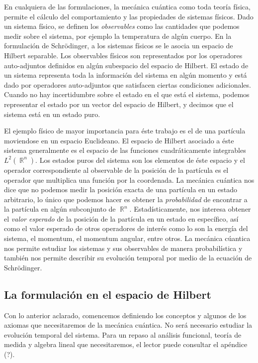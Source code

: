 \documentclass[a4paper]{report}
\DeclareMathOperator{\R}{\mathbb{R}}
\begin{document}
  En cualquiera de las formulaciones, la mecánica cuántica
  como toda teoría física, permite el cálculo del
  comportamiento y las propiedades de sistemas físicos. Dado
  un sistema físico, se definen los \textit{observables}
  como las cantidades que podemos medir sobre el sistema,
  por ejemplo la temperatura de algún cuerpo. En la
  formulación de Schrödinger, a los sistemas físicos se le
  asocia un espacio de Hilbert separable. Los observables
  físicos son representados por los operadores auto-adjuntos
  definidos en algún subespacio del espacio de Hilbert. El
  estado de un sistema representa toda la información del
  sistema en algún momento y está dado por operadores
  auto-adjuntos que satisfacen ciertas condiciones
  adicionales. Cuando no hay incertidumbre sobre el estado
  en el que está el sistema, podemos representar el estado
  por un vector del espacio de Hilbert, y decimos que el
  sistema está en un estado puro.

  El ejemplo físico de mayor importancia para éste trabajo
  es el de una partícula moviendose en un espacio
  Euclideano. El espacio de Hilbert asociado a éste sistema
  generalmente es el espacio de las funciones
  cuadráticamente integrables $L^2(\R^{n})$. Los estados
  puros del sistema son los elementos de éste espacio y el
  operador correspondiente al observable de la posición de
  la partícula es el operador que multiplica una función por
  la coordenada. La mecánica cuántica nos dice que no
  podemos medir la posición exacta de una partícula en un
  estado arbitrario, lo único que podemos hacer es obtener
  la \textit{probabilidad} de encontrar a la partícula en
  algún subconjunto de $\R^{n}$.  Estadísticamente, nos
  interesa obtener el \textit{valor esperado} de la posición
  de la partícula en un estado en específico, así como el
  valor esperado de otros operadores de interés como lo son
  la energía del sistema, el momentum, el momentum angular,
  entre otros. La mecánica cúantica nos permite estudiar los
  sistemas y sus observables de manera probabilística y
  también nos permite describir su evolución temporal por
  medio de la ecuación de Schrödinger. 
  
  \subsection{La formulación en el espacio de Hilbert}

  Con lo anterior aclarado, comencemos definiendo los
  conceptos y algunos de los axiomas que necesitaremos de la
  mecánica cuántica. No será necesario estudiar la evolución
  temporal del sistema. Para un repaso al análisis
  funcional, teoría de medida y algebra lineal que
  necesitaremos, el lector puede consultar el apéndice (?).
\end{document}
